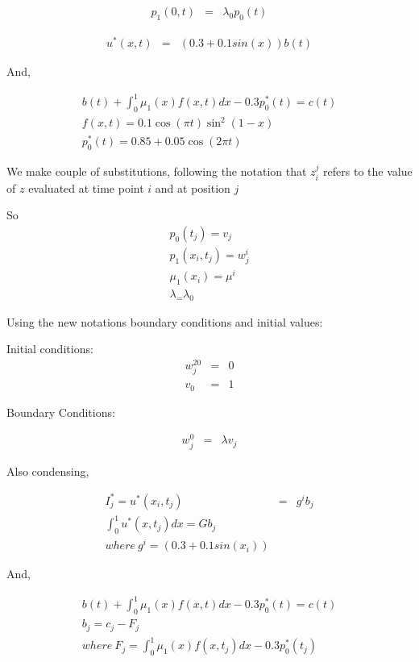 \documentclass{ifacconf}
\begin{document}
\begin{eqnarray}
p_1(0,t) &=& \lambda_0 p_0(t)
\end{eqnarray}

\begin{eqnarray}
u^{*}(x,t) &=& (0.3+0.1 sin(x))b(t) 
\end{eqnarray}

And,

\begin{eqnarray}
b(t)+\int_0^1\mu_1(x)f(x,t)dx -0.3p_0^{*}(t) = c(t)\\
f(x,t) = 0.1\cos(\pi t)\sin^2(1-x)\\
p_0^{*}(t) = 0.85+0.05\cos(2\pi t)
\end{eqnarray}



We make couple of substitutions, following the notation that
$z_i^j$ refers to the value of $z$ evaluated at time point $i$ and at position $j$

So 
\begin{eqnarray}
p_0(t_j) = v_j \nonumber \\
p_1(x_i,t_j) = w_j^i \\
\mu_1(x_i) = \mu^i \\
\lambda_ = \lambda_0
\end{eqnarray} 


Using the new notations boundary conditions and initial values:


Initial conditions:
\begin{eqnarray}
w_j^{20} &=& 0\\
v_0 &=& 1
\end{eqnarray}

Boundary Conditions:

\begin{eqnarray}
w_j^0 &=&  \lambda v_j
\end{eqnarray}

Also condensing,


\begin{eqnarray}
	I_j^{*}=u^{*}(x_i,t_j) &=& g^ib_j \\
\int_0^1 u^{*}(x,t_j)dx = Gb_j\\
where\ g^i = (0.3+0.1sin(x_i)) \nonumber
\end{eqnarray}

And,

\begin{eqnarray}
b(t)+\int_0^1\mu_1(x)f(x,t)dx -0.3p_0^{*}(t) = c(t) \nonumber \\
b_j = c_j - F_j \\
where\ F_j = \int_0^1\mu_1(x)f(x,t_j)dx -0.3p_0^{*}(t_j)\\
\end{eqnarray}
\end{document}
